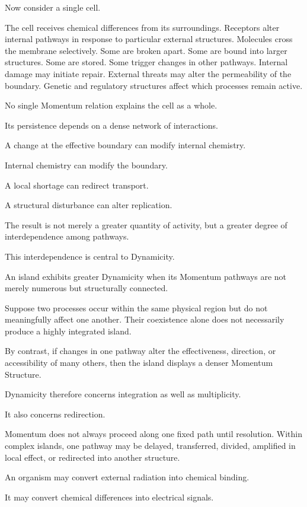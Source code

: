 Now consider a single cell.

The cell receives chemical differences from its surroundings. Receptors alter internal pathways in response to particular external structures. Molecules cross the membrane selectively. Some are broken apart. Some are bound into larger structures. Some are stored. Some trigger changes in other pathways. Internal damage may initiate repair. External threats may alter the permeability of the boundary. Genetic and regulatory structures affect which processes remain active.

No single Momentum relation explains the cell as a whole.

Its persistence depends on a dense network of interactions.

A change at the effective boundary can modify internal chemistry.

Internal chemistry can modify the boundary.

A local shortage can redirect transport.

A structural disturbance can alter replication.

The result is not merely a greater quantity of activity, but a greater degree of interdependence among pathways.

This interdependence is central to Dynamicity.

An island exhibits greater Dynamicity when its Momentum pathways are not merely numerous but structurally connected.

Suppose two processes occur within the same physical region but do not meaningfully affect one another. Their coexistence alone does not necessarily produce a highly integrated island.

By contrast, if changes in one pathway alter the effectiveness, direction, or accessibility of many others, then the island displays a denser Momentum Structure.

Dynamicity therefore concerns integration as well as multiplicity.

It also concerns redirection.

Momentum does not always proceed along one fixed path until resolution. Within complex islands, one pathway may be delayed, transferred, divided, amplified in local effect, or redirected into another structure.

An organism may convert external radiation into chemical binding.

It may convert chemical differences into electrical signals.

